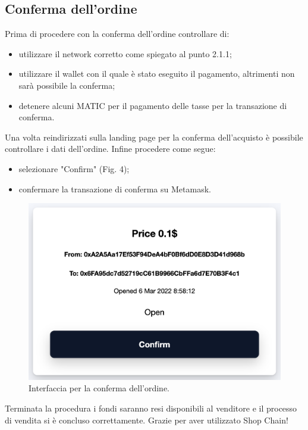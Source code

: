 \documentclass[a4paper, 12pt]{article}
\begin{document}
\subsection{Conferma dell'ordine}
Prima di procedere con la conferma dell'ordine controllare di:
\begin{itemize}
\item utilizzare il network corretto come spiegato al punto 2.1.1;
\item utilizzare il wallet con il quale è stato eseguito il pagamento, altrimenti non sarà possibile la conferma;
\item detenere alcuni MATIC per il pagamento delle tasse per la transazione di conferma.
\end{itemize}
Una volta reindirizzati sulla landing page per la conferma dell'acquisto è possibile controllare i dati dell'ordine. Infine procedere come segue:
\begin{itemize}
\item selezionare "Confirm" (Fig. 4);
\item confermare la transazione di conferma su Metamask.
\end{itemize}

\FloatBarrier
\begin{figure}
\centering
\includegraphics[width=0.5\linewidth]{img/conferma_ordine.png}
\caption{Interfaccia per la conferma dell'ordine.}
\end{figure}
\FloatBarrier
Terminata la procedura i fondi saranno resi disponibili al venditore e il processo di vendita si è concluso correttamente.
Grazie per aver utilizzato Shop Chain!
\end{document}
